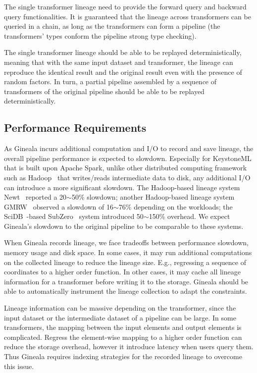 \documentclass{sig-alternate}
\begin{document}
The single transformer lineage need to provide the forward query and backward query functionalities. 
It is  guaranteed that the lineage across transformers can be queried in a chain, as long as the transformers
can form a pipeline (the transformers' types conform the pipeline strong type checking).

The single transformer lineage should be able to be replayed deterministically, meaning that with the same input dataset and transformer,
the lineage can reproduce the identical result and the original result even with the presence of random factors.
In turn, a partial pipeline assembled by a sequence of transformers of the original pipeline should be able to be replayed deterministically.

\subsection{Performance Requirements}
\label{sec:Req-Perf}
As Gineala incurs additional computation and I/O to record and save lineage, the overall pipeline performance is expected to slowdown.
Especially for KeystoneML that is built upon Apache Spark, unlike other distributed computing framework such as Hadoop~\cite{HADOOP} 
that writes/reads intermediate data to disk, any additional I/O can introduce a more significant slowdown. 
The Hadoop-based lineage system Newt~\cite{logothetis13} reported a 20$\sim$50\% slowdown; 
another Hadoop-based lineage system GMRW~\cite{ikeda11} observed a slowdown of 16$\sim$76\% depending on the workloads;
the SciDB~\cite{brown10}-based SubZero~\cite{wu13} system introduced 50$\sim$150\% overhead. 
We expect Gineala's slowdown to the original pipeline to be comparable to these systems.

When Gineala records lineage, we face tradeoffs between performance slowdown, memory usage and disk space.
In some cases, it may run additional computations on the collected lineage to reduce the lineage size. 
E.g., regressing a sequence of coordinates to a higher order function. 
In other cases, it may cache all lineage information for a transformer before writing it to the storage. 
Gineala should be able to automatically instrument the lineage collection to adapt the constraints.

Lineage information can be massive depending on the transformer, since the input dataset or the intermediate dataset of a pipeline can be large.
In some transformers, the mapping between the input elements and output elements is complicated. 
Regress the element-wise mapping to a higher order function can reduce the storage overhead, however it introduce latency when users
query them. Thus Gineala requires indexing strategies for the recorded lineage to overcome this issue.
\end{document}
